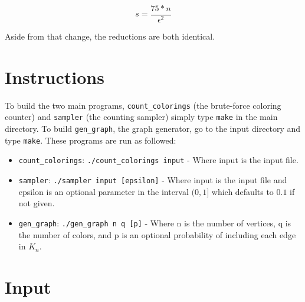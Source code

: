 \documentclass[14]{article}
\begin{document}
\[ s = \frac{75*n}{\epsilon^2} \]

Aside from that change, the reductions are both identical.

\section{Instructions}
To build the two main programs, \texttt{count\_colorings} (the brute-force coloring counter) and \texttt{sampler} (the counting sampler) simply type \texttt{make} in the main directory. To build \texttt{gen\_graph}, the graph generator, go to the input directory and type \texttt{make}. These programs are run as followed:
\begin{itemize}
\item \texttt{count\_colorings}: \texttt{./count\_colorings input} - Where input is the input file.
\item \texttt{sampler}: \texttt{./sampler input [epsilon]} - Where input is the input file and epsilon is an optional parameter in the interval $(0,1]$ which defaults to $0.1$ if not given.
\item \texttt{gen\_graph}: \texttt{./gen\_graph n q [p]} - Where n is the number of vertices, q is the number of colors, and p is an optional probability of including each edge in $K_n$.
\end{itemize}
\section{Input}
\end{document}
